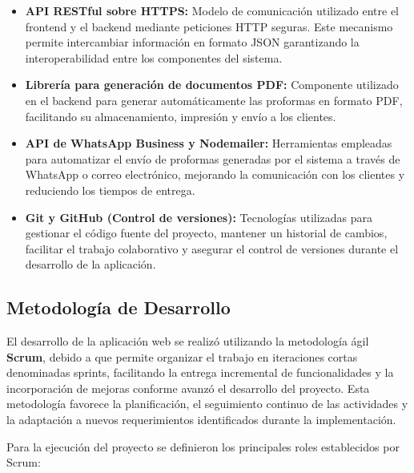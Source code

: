 \begin{itemize}
\item \textbf{API RESTful sobre HTTPS:} Modelo de comunicación utilizado entre el frontend y el backend mediante peticiones HTTP seguras. Este mecanismo permite intercambiar información en formato JSON garantizando la interoperabilidad entre los componentes del sistema.

\item \textbf{Librería para generación de documentos PDF:} Componente utilizado en el backend para generar automáticamente las proformas en formato PDF, facilitando su almacenamiento, impresión y envío a los clientes.

\item \textbf{API de WhatsApp Business y Nodemailer:} Herramientas empleadas para automatizar el envío de proformas generadas por el sistema a través de WhatsApp o correo electrónico, mejorando la comunicación con los clientes y reduciendo los tiempos de entrega.

\item \textbf{Git y GitHub (Control de versiones):} Tecnologías utilizadas para gestionar el código fuente del proyecto, mantener un historial de cambios, facilitar el trabajo colaborativo y asegurar el control de versiones durante el desarrollo de la aplicación.

\end{itemize}
\subsection{Metodología de Desarrollo}

El desarrollo de la aplicación web se realizó utilizando la metodología ágil \textbf{Scrum}, debido a que permite organizar el trabajo en iteraciones cortas denominadas sprints, facilitando la entrega incremental de funcionalidades y la incorporación de mejoras conforme avanzó el desarrollo del proyecto. Esta metodología favorece la planificación, el seguimiento continuo de las actividades y la adaptación a nuevos requerimientos identificados durante la implementación.

Para la ejecución del proyecto se definieron los principales roles establecidos por Scrum:

